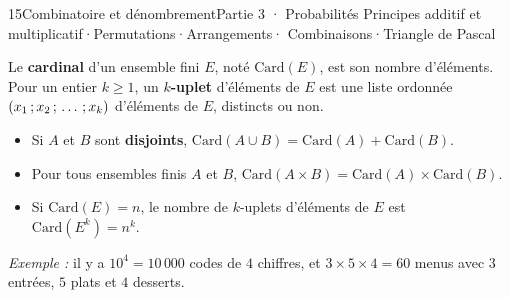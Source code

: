 
\begin{ouverture}[denombrement]{15}{Combinatoire et dénombrement}{Partie 3 · Probabilités}
  {Principes additif et multiplicatif\enspace·\enspace Permutations\enspace·\enspace Arrangements\enspace·\enspace
   Combinaisons\enspace·\enspace Triangle de Pascal}
\end{ouverture}

\essentiel


\begin{definition}[Cardinal]
Le \textbf{cardinal} d'un ensemble fini $E$, noté $\mathrm{Card}(E)$, est son nombre d'éléments. Pour un entier $k\geq1$, un
\textbf{$k$-uplet} d'éléments de $E$ est une liste ordonnée $(x_1\,{;}\, x_2\,{;}\,\dots\,{;}\, x_k)$ d'éléments de $E$, distincts ou non.
\end{definition}

\begin{theoreme}
\begin{itemize}[label={\color{otNavy}\textbullet},leftmargin=1.2em,itemsep=0.5mm,topsep=0.5mm]
  \item Si $A$ et $B$ sont \textbf{disjoints}, $\mathrm{Card}(A\cup B)=\mathrm{Card}(A)+\mathrm{Card}(B)$.
  \item Pour tous ensembles finis $A$ et $B$, $\mathrm{Card}(A\times B)=\mathrm{Card}(A)\times\mathrm{Card}(B)$.
  \item Si $\mathrm{Card}(E)=n$, le nombre de $k$-uplets d'éléments de $E$ est $\mathrm{Card}\left(E^{k}\right)=n^{k}$.
\end{itemize}
\emph{Exemple :} il y a $10^{4}=10\,000$ codes de $4$ chiffres, et $3\times5\times4=60$ menus avec $3$ entrées, $5$ plats et $4$ desserts.
\end{theoreme}

